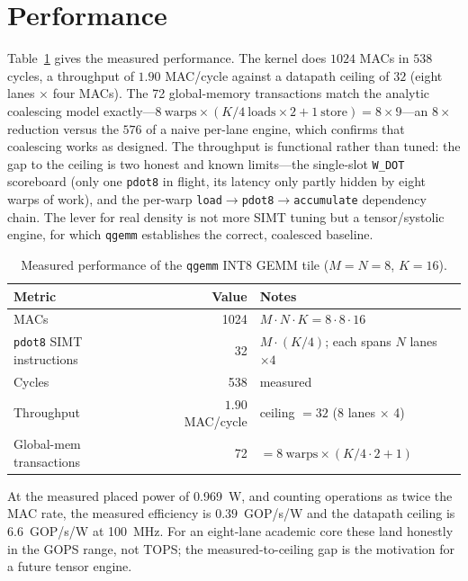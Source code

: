 \documentclass[12pt,a4paper,oneside]{report}
\newcommand{\code}[1]{\texttt{#1}}
\begin{document}
\section{Performance}
Table~\ref{tab:qgemm} gives the measured performance. The kernel does $1024$ MACs
in $538$ cycles, a throughput of $1.90$ MAC/cycle against a datapath ceiling of
$32$ (eight lanes $\times$ four MACs). The \num{72} global-memory transactions
match the analytic coalescing model exactly---$8\ \text{warps}\times(K/4\ \text{loads}
\times 2 + 1\ \text{store})=8\times 9$---an $8\times$ reduction versus the $576$ of a
naive per-lane engine, which confirms that coalescing works as designed. The
throughput is functional rather than tuned: the gap to the ceiling is two honest
and known limits---the single-slot \code{W\_DOT} scoreboard (only one \code{pdot8}
in flight, its latency only partly hidden by eight warps of work), and the
per-warp \code{load}$\rightarrow$\code{pdot8}$\rightarrow$\code{accumulate}
dependency chain. The lever for real density is not more SIMT tuning but a
tensor/systolic engine, for which \code{qgemm} establishes the correct, coalesced
baseline.

\begin{table}[t]
\caption{Measured performance of the \code{qgemm} INT8 GEMM tile ($M{=}N{=}8$,
$K{=}16$).}
\label{tab:qgemm}
\centering
\small
\begin{tabular}{lrl}
\toprule
Metric & Value & Notes\\
\midrule
MACs & \num{1024} & $M\cdot N\cdot K = 8\cdot 8\cdot 16$\\
\code{pdot8} SIMT instructions & 32 & $M\cdot(K/4)$; each spans $N$ lanes $\times 4$\\
Cycles & 538 & measured\\
Throughput & $1.90$ MAC/cycle & ceiling $= 32$ (8 lanes $\times$ 4)\\
Global-mem transactions & 72 & $= 8\ \text{warps}\times(K/4\cdot 2 + 1)$\\
\bottomrule
\end{tabular}
\end{table}

At the measured placed power of \SI{0.969}{\watt}, and counting operations as
twice the MAC rate, the measured efficiency is $0.39$~GOP/s/W and the datapath
ceiling is $6.6$~GOP/s/W at \SI{100}{\mega\hertz}. For an eight-lane academic core
these land honestly in the GOPS range, not TOPS; the measured-to-ceiling gap is
the motivation for a future tensor engine.
\end{document}
